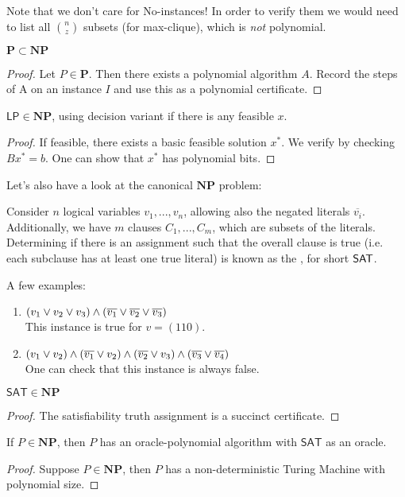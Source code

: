 \begin{remark}
    Note that we don't care for No-instances! In order to verify them we would need to
    list all $\binom{n}{z}$ subsets (for max-clique), which is \emph{not} polynomial.
\end{remark}
\begin{theorem}
    $\mathbf{P} \subset \mathbf{NP}$
\end{theorem}
\begin{proof}
    Let $P\in \mathbf{P}$. Then there exists a polynomial algorithm $A$.
    Record the steps of A on an instance $I$ and use this as a polynomial certificate.
\end{proof}
\begin{theorem}
    $\mathsf{LP} \in \mathbf{NP}$, using decision variant if there is any feasible $x$.
\end{theorem}
\begin{proof}
    If feasible, there exists a basic feasible solution $x^*$.
    We verify by checking $Bx^*=b$. One can show that $x^*$ has polynomial bits.
\end{proof}
Let's also have a look at the canonical $\mathbf{NP}$ problem:
\begin{definition}
    Consider $n$ logical variables $v_1,...,v_n$,
    allowing also the negated literals $\overline{v_i}$.
    Additionally, we have $m$ clauses $C_1,...,C_m$, which are subsets of the literals.
    Determining if there is an assignment such that the overall clause is true (i.e. each subclause has at least one true literal)
    is known as the , for short $\mathsf{SAT}$.
\end{definition}
\begin{example} A few examples: \label{ex:SAT_formulas}
    \begin{enumerate}
        \item $(v_1 \vee v_2 \vee v_3) \wedge (\overline{v_1} \vee \overline{v_2} \vee \overline{v_3})$\\
              This instance is true for $v=(110)$.
        \item $(v_1 \vee v_2) \wedge (\overline{v_1} \vee v_2) \wedge (\overline{v_2} \vee v_3) \wedge (\overline{v_3} \vee \overline{v_4})$\\
              One can check that this instance is always false.
    \end{enumerate}
\end{example}
\begin{theorem}
    $\mathsf{SAT} \in \mathbf{NP}$
\end{theorem}
\begin{proof}
    The satisfiability truth assignment is a succinct certificate.
\end{proof}
\begin{theorem}[Cook]
    If $P\in \mathbf{NP}$, then $P$ has an oracle-polynomial algorithm with $\mathsf{SAT}$ as an oracle.
\end{theorem}
\begin{proof}
    Suppose $P \in \mathbf{NP}$, then $P$ has a non-deterministic Turing Machine with polynomial size.
\end{proof}
